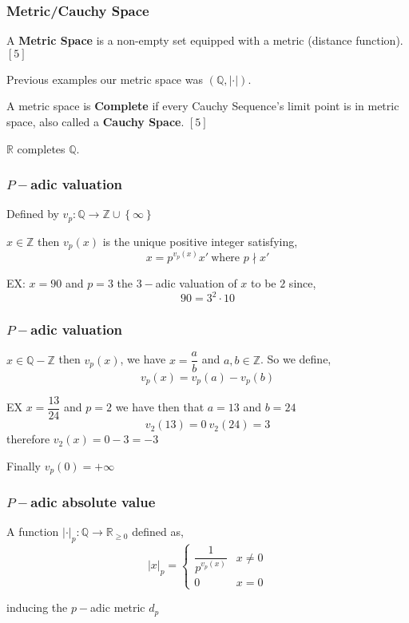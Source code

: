 \documentclass{beamer}
\newcommand{\zz}{\mathbb Z}   %
\newcommand{\qq}{\mathbb Q}   %
\newcommand{\rr}{\mathbb R}   %
\newcommand{\abs}[1]{\left\lvert#1\right\rvert} %
\renewcommand{\geq}{\geqslant}
\newcommand{\lrb}[1]{\left[#1\right]}
\newcommand{\lrc}[1]{\left\{#1\right\}}
\begin{document}
    \begin{frame}
        \frametitle{Metric/Cauchy Space}
        A \textbf{Metric Space} is a non-empty set equipped with a metric (distance function).$\lrb{5}$ \pause

        Previous examples our metric space was $(\qq, \abs{\cdot})$. \pause 

        A metric space is \textbf{Complete} if every Cauchy Sequence's limit point is in metric space, also called a \textbf{Cauchy Space}. $\lrb{5}$ \pause 

        $\rr$ completes $\qq$.
    \end{frame}
    
    \begin{frame}
        \frametitle{$P-$adic valuation}
            Defined by $v_p: \qq \to \zz \cup \lrc{\infty}$ \pause

            $x \in \zz$ then $v_p(x)$ is the unique positive integer satisfying,
            \[x = p^{v_p(x)} x' \ \text{where }p \nmid x'\] \pause

            EX: $x = 90$ and $p = 3$ the $3-$adic valuation of $x$ to be $2$ since, 
            \[90 = 3^{2}\cdot 10\]

            
    \end{frame}

    \begin{frame}
        \frametitle{$P-$adic valuation}
        $x \in \qq - \zz$ then $v_p(x)$, we have $x = \dfrac{a}{b}$ and $a,b \in \zz$. So we define,
            \[v_p(x) = v_p(a) - v_p(b)\] \pause

        EX $x = \dfrac{13}{24}$ and $p = 2$ we have then that $a = 13$ and $b = 24$ \pause
        \[v_2(13) = 0 \ v_2(24) = 3\] \pause
        therefore $v_2(x) = 0 -3 = -3$ \pause

        Finally $v_p(0) = +\infty$
    
        
    
    \end{frame}

    \begin{frame}
        \frametitle{$P-$adic absolute value}
        A function $\abs{\cdot}_p: \qq \to \rr_{\geq 0}$ defined as,
        \[\abs{x}_p = \begin{cases}
            \dfrac{1}{p^{v_p(x)}} & x \neq 0 \\
            0 & x = 0
        \end{cases}\] \pause

        inducing the $p-$adic metric $d_p$
    \end{frame}
\end{document}

